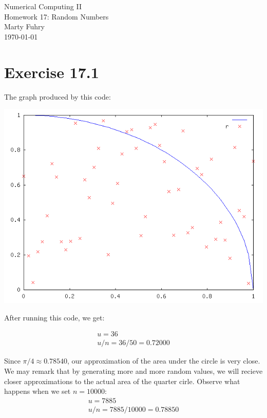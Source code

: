 \documentclass[11pt]{article}
\begin{document}
         
\newcommand{\makehomework}[2]%
{\begin{center}%
	\Huge #1\\%
	\Large #2\\%
	Marty Fuhry\\%
	\today%
\end{center}}
\makehomework{Numerical Computing II}{Homework 17: Random Numbers}

\section*{Exercise 17.1}


\pagebreak
The graph produced by this code:

\begin{center}
\includegraphics[scale=0.5]{problem_17_1_graph.png}
\end{center}

After running this code, we get:

\begin{align*}
	u = 36 \\
	u/n = 36/50 = 0.72000
\end{align*}

Since $\pi/4 \approx 0.78540$, our approximation of the area under the circle is very close. We
may remark that by generating more and more random values, we will
recieve closer approximations to the actual area of the quarter 
cirle. Observe what happens when we set $n = 10000$:
\begin{align*}
	u =  7885\\
	u/n = 7885/10000 = 0.78850
\end{align*}
\end{document}
